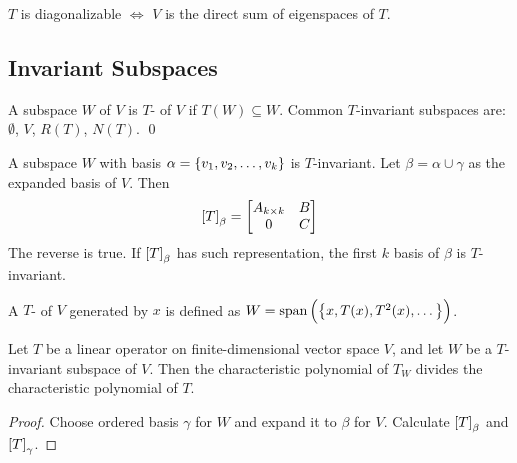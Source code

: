 \begin{theorem}
    $T$ is diagonalizable $\iff$ $V$ is the direct sum of eigenspaces of $T$.
\end{theorem}


\subsection{Invariant Subspaces}

\begin{definition}
    A subspace $W$ of $V$ is $T$- of $V$ if $T(W) \subseteq W$.
    Common $T$-invariant subspaces are: $\emptyset$, $V$, $R(T)$, $N(T)$.
    \qed
\end{definition}

\begin{theorem}
    A subspace $W$ with basis $\alpha = \set{v_1, v_2, \dots, v_k}$ is $T$-invariant. Let $\beta = \alpha \cup \gamma$ as the expanded basis of $V$. Then
    \begin{equation}
        \coordinate{T}_\beta = \begin{bmatrix}
            A_{k \times k} & B \\
            0 & C
        \end{bmatrix}
    \end{equation}
    The reverse is true. If $\coordinate{T}_\beta$  has such representation, the first $k$ basis of $\beta$ is $T$-invariant. 
\end{theorem}



\begin{definition}
    A $T$- of $V$ generated by $x$ is defined as $W=\text{span} \left(  \set{x, T(x), T^2(x), \dots} \right)$.
\end{definition}

\begin{theorem}
    Let $T$ be a linear operator on finite-dimensional vector space $V$, and let $W$ be a $T$-invariant subspace of $V$. Then the characteristic polynomial of $T_W$ divides the characteristic polynomial of $T$.
\end{theorem}

\begin{proof}
    Choose ordered basis $\gamma$ for $W$ and expand it to $\beta$ for $V$. Calculate $\coordinate{T}_\beta$ and $\coordinate{T}_\gamma$.
\end{proof}



